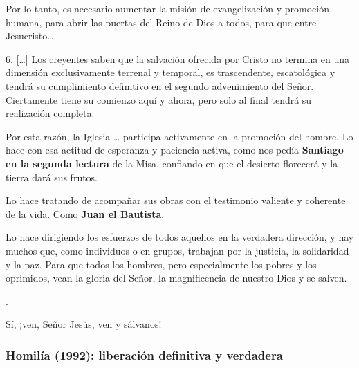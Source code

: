 \begin{body}
					Por lo tanto, es necesario aumentar la misión de evangelización y promoción humana, para abrir las puertas del Reino de Dios a todos, para que entre Jesucristo\ldots{}
					
					6. {[}\ldots{}{]} Los creyentes saben que la salvación ofrecida por Cristo no termina en una dimensión exclusivamente terrenal y temporal, es trascendente, escatológica y tendrá su cumplimiento definitivo en el segundo advenimiento del Señor. Ciertamente tiene su comienzo aquí y ahora, pero solo al final tendrá su realización completa.
					
					Por esta razón, la Iglesia \ldots{} participa activamente en la promoción del hombre. Lo hace con esa actitud de esperanza y paciencia activa, como nos pedía \textbf{Santiago en la segunda lectura} de la Misa, confiando en que el desierto florecerá y la tierra dará sus frutos.
					
					Lo hace tratando de acompañar sus obras con el testimonio valiente y coherente de la vida. Como \textbf{Juan el Bautista}.
					
					Lo hace dirigiendo los esfuerzos de todos aquellos en la verdadera dirección, y hay muchos que, como individuos o en grupos, trabajan por la justicia, la solidaridad y la paz. Para que todos los hombres, pero especialmente los pobres y los oprimidos, vean la gloria del Señor, la magnificencia de nuestro Dios y se salven.
					
					.
					
					Sí, ¡ven, Señor Jesús, ven y sálvanos!
				\end{body}
			
			\subsubsection{Homilía (1992): liberación definitiva y verdadera}
			
				

